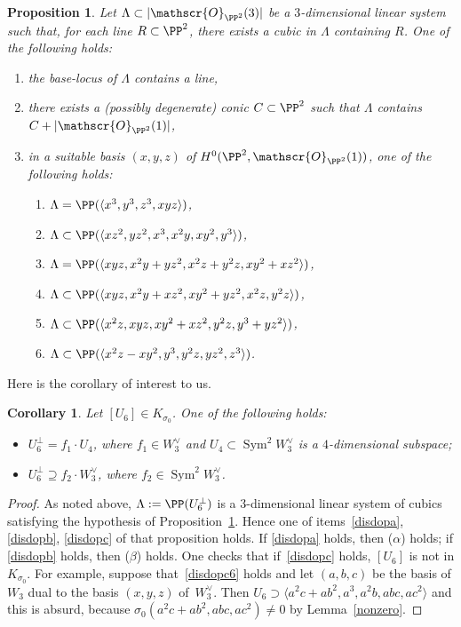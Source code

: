 \documentclass[JEP,XML,SOM,Unicode, NoEqCountersInSection,NoFloatCountersInSection]{cedram}
\let\mathcal\mathscr
\newenvironment{enumeratea}
{\bgroup\def\theenumi{\alph{enumi}}\def\theenumii{\arabic{enumii}}\begin{enumerate}}
{\end{enumerate}\egroup}
\newtheorem{coro}[lemm]{Corollary}
\newtheorem{prop}[lemm]{Proposition}
\theoremstyle{definition}
\newcommand\cO{\mathcal{O}}\let\OO\cO
\let\la\langle
\let\ra\rangle
\DeclareMathOperator{\Sym}{Sym}
\begin{document}
\begin{prop}\label{disdop}
Let $\Lambda\subset|\cO_{\PP^2}(3)|$ be a $3$-dimensional linear system such that, for each line $R\subset \PP^2$, there exists a cubic in $\Lambda$ containing $R$. One of the following holds:
\begin{enumeratea}
\item\label{disdopa}
the base-locus of $\Lambda$ contains a line,
\item\label{disdopb}
there exists a (possibly degenerate) conic $C\subset \PP^2$ such that $\Lambda$ contains $C+|\cO_{\PP^2}(1)|$,
\item\label{disdopc}
in a suitable basis $(x,y,z)$ of $H^0(\PP^2,\cO_{\PP^2}(1))$, one of the following holds:
\begin{enumerate}
\item\label{disdopc1}
$\Lambda=\PP(\la x^3,y^3,z^3,xyz\ra)$,
\item\label{disdopc2}
$\Lambda\subset\PP(\la xz^2,yz^2,x^3,x^2y,xy^2,y^3\ra)$,
\item\label{disdopc3}
$\Lambda=\PP(\la xyz,x^2y+yz^2,x^2z+y^2z,xy^2+xz^2\ra)$,
\item\label{disdopc4}
$\Lambda\subset\PP(\la xyz,x^2y+xz^2,xy^2+yz^2,x^2z,y^2z\ra)$,
\item\label{disdopc5}
$\Lambda\subset\PP(\la x^2z, xyz, xy^2+xz^2,y^2z, y^3+yz^2 \ra)$,
\item\label{disdopc6}
$\Lambda\subset\PP(\la x^2z-xy^2, y^3, y^2z, yz^2, z^3 \ra)$.
\end{enumerate}
\end{enumeratea}
\end{prop}

Here is the corollary of interest to us.

\begin{coro}\label{tutti2jet}
Let $[U_6]\in K_{\sigma_0}$. One of the following holds:
\begin{itemize}
\item[$(\alpha)$]
$U_6^{\bot}=f_1\cdot U_4$, where $ f_1\in W_3^{\vee}$ and $U_4\subset\Sym^2\! W_3^{\vee}$ is a $4$-dimensional subspace;
\item[$(\beta)$]
$U_6^{\bot}\supseteq f_2\cdot W_3^{\vee}$, where $ f_2\in\Sym^2\! W_3^{\vee}$.
\end{itemize}
\end{coro}

\begin{proof}
As noted above, $\Lambda:=\PP(U^{\bot}_6)$ is a $3$-dimensional linear system of cubics satisfying the hypothesis of Proposition~\ref{disdop}. Hence one of items~\eqref{disdopa}, \eqref{disdopb}, \eqref{disdopc} of that proposition holds. If \eqref{disdopa} holds, then ($\alpha$) holds; if
\eqref{disdopb} holds, then ($\beta$) holds. One checks that if~\eqref{disdopc} holds, $[U_6]$ is not in $K_{\sigma_0}$. For example, suppose that~\eqref{disdopc6} holds and let $(a,b,c)$ be the basis of $W_3$ dual to the basis $(x,y,z)$ of~$W_3^{\vee}$. Then $U_6\supset\la a^2c+ab^2,a^3,a^2b,abc,ac^2\ra$ and this is absurd, because
$\sigma_0(a^2c+ab^2,abc,ac^2)\not=0$ by Lemma~\ref{nonzero}.
\end{proof}
\end{document}
